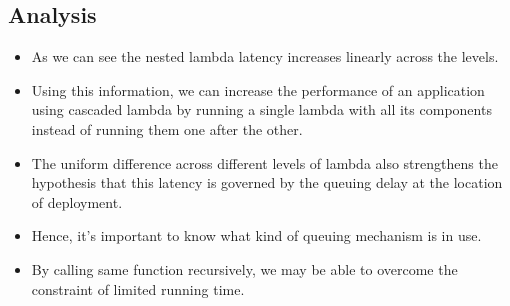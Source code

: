\subsection{Analysis}

\begin{itemize}
    \item As we can see the nested lambda latency increases linearly across the levels.
    \item Using this information, we can increase the performance of an application using cascaded lambda by running a single lambda with all its components instead of running them one after the other.
    \item The uniform difference across different levels of lambda also strengthens the hypothesis that this latency is governed by the queuing delay at the location of deployment. 
    \item Hence, it's important to know what kind of queuing mechanism is in use.
    \item By calling same function recursively, we may be able to overcome the constraint of limited running time.
\end{itemize}
